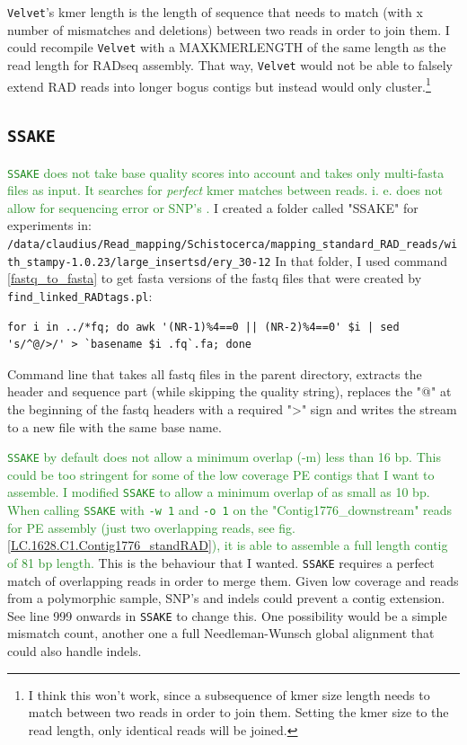 \documentclass{article}\usepackage[]{graphicx}\usepackage[]{color}
\newcommand{\roger}[1]{ \textcolor[named]{ForestGreen}{#1} }
\begin{document}
\texttt{Velvet}'s kmer length is the length of sequence that needs to match (with x number of mismatches and deletions) between two reads in order to join them. I could recompile \texttt{Velvet} with a MAXKMERLENGTH of the same length as the read length for RADseq assembly. That way, \texttt{Velvet} would not be able to falsely extend RAD reads into longer bogus contigs but instead would only cluster.\footnote{I think this won't work, since a subsequence of kmer size length needs to match between two reads in order to join them. Setting the kmer size to the read length, only identical reads will be joined.}
\vspace{10pt}


\subsection{\texttt{SSAKE}}

\roger{\texttt{SSAKE} does not take base quality scores into account and takes only multi-fasta files as input. It searches for \emph{perfect} kmer matches between reads. i. e. does not allow for sequencing error or SNP's \citep{Warren2007}. }
I created a folder called "SSAKE" for experiments in: \\
{\scriptsize{
\texttt{/data/claudius/Read\_mapping/Schistocerca/mapping\_standard\_RAD\_reads/with\_stampy-1.0.23/large\_insertsd/ery\_30-12}
}}
In that folder, I used command \ref{fastq_to_fasta} to get fasta versions of the fastq files that were created by \texttt{find\_linked\_RADtags.pl}:

\begin{command}
\captionsetup{type=command}
\begin{Verbatim}[fontsize=\footnotesize]
for i in ../*fq; do awk '(NR-1)%4==0 || (NR-2)%4==0' $i | sed 's/^@/>/' > `basename $i .fq`.fa; done
\end{Verbatim}
\caption{Command line that takes all fastq files in the parent directory, extracts the header and sequence part (while skipping the quality string), replaces the "@" at the beginning of the fastq headers with a required ">" sign and writes the stream to a new file with the same base name.}
\label{fastq_to_fasta}
\end{command}

\roger{\texttt{SSAKE} by default does not allow a minimum overlap (-m) less than 16 bp. This could be too stringent for some of the low coverage PE contigs that I want to assemble. I modified \texttt{SSAKE} to allow a minimum overlap of as small as 10 bp. When calling \texttt{SSAKE} with \texttt{-w 1} and \texttt{-o 1} on the "Contig1776\_downstream" reads for PE assembly (just two overlapping reads, see fig. \ref{LC.1628.C1.Contig1776_standRAD}), it is able to assemble a full length contig of 81 bp length.} This is the behaviour that I wanted. \texttt{SSAKE} requires a perfect match of overlapping reads in order to merge them. Given low coverage and reads from a polymorphic sample, SNP's and indels could prevent a contig extension. See line 999 onwards in \texttt{SSAKE} to change this. One possibility would be a simple mismatch count, another one a full Needleman-Wunsch global alignment that could also handle indels.
\end{document}

